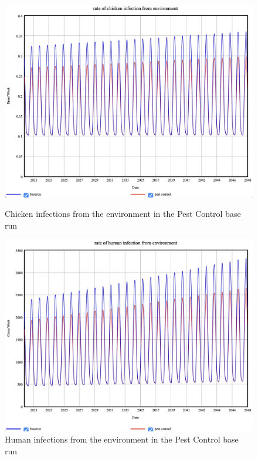 \begin{figure}[h!]
    \centering
    \begin{minipage}{0.45\textwidth}
        \centering
        \includegraphics[width=1\textwidth]{images/p3_chicken.jpeg} 
        \caption{Chicken infections from the environment in the Pest Control base run}
        \label{fig:p3_chicken}
    \end{minipage}\hfill
    \begin{minipage}{0.45\textwidth}
        \centering
        \includegraphics[width=1\textwidth]{images/p3_human.jpeg}
        \caption{Human infections from the environment in the Pest Control base run}
        \label{fig:p3_human}
    \end{minipage}
\end{figure} 

